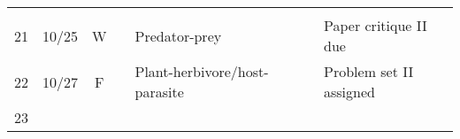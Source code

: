 \documentclass[]{article}
\begin{document}
\begin{longtable}[]{@{}cccllll@{}}
\begin{minipage}[t]{0.16\columnwidth}
\strut
\end{minipage}\tabularnewline
\begin{minipage}[t]{0.12\columnwidth}\centering\strut
21\strut
\end{minipage} & \begin{minipage}[t]{0.08\columnwidth}\centering\strut
10/25\strut
\end{minipage} & \begin{minipage}[t]{0.07\columnwidth}\centering\strut
W\strut
\end{minipage} & \begin{minipage}[t]{0.10\columnwidth}\raggedright\strut
\strut
\end{minipage} & \begin{minipage}[t]{0.11\columnwidth}\raggedright\strut
Predator-prey\strut
\end{minipage} & \begin{minipage}[t]{0.11\columnwidth}\raggedright\strut
\strut
\end{minipage} & \begin{minipage}[t]{0.16\columnwidth}\raggedright\strut
Paper critique II due\strut
\end{minipage}\tabularnewline
\begin{minipage}[t]{0.12\columnwidth}\centering\strut
22\strut
\end{minipage} & \begin{minipage}[t]{0.08\columnwidth}\centering\strut
10/27\strut
\end{minipage} & \begin{minipage}[t]{0.07\columnwidth}\centering\strut
F\strut
\end{minipage} & \begin{minipage}[t]{0.10\columnwidth}\raggedright\strut
\strut
\end{minipage} & \begin{minipage}[t]{0.11\columnwidth}\raggedright\strut
Plant-herbivore/host-parasite\strut
\end{minipage} & \begin{minipage}[t]{0.11\columnwidth}\raggedright\strut
\strut
\end{minipage} & \begin{minipage}[t]{0.16\columnwidth}\raggedright\strut
Problem set II assigned\strut
\end{minipage}\tabularnewline
\begin{minipage}[t]{0.12\columnwidth}\centering\strut
23\strut
\end{minipage} & \begin{minipage}[t]{0.08\columnwidth}\centering\strut

\end{minipage}
\end{longtable}
\end{document}
